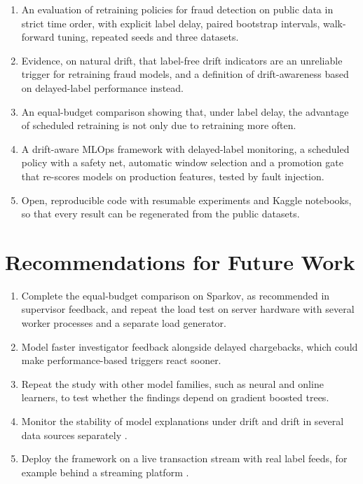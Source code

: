 \begin{enumerate}
  \item An evaluation of retraining policies for fraud detection on public data in strict time order, with explicit label delay, paired bootstrap intervals, walk-forward tuning, repeated seeds and three datasets.
  \item Evidence, on natural drift, that label-free drift indicators are an unreliable trigger for retraining fraud models, and a definition of drift-awareness based on delayed-label performance instead.
  \item An equal-budget comparison showing that, under label delay, the advantage of scheduled retraining is not only due to retraining more often.
  \item A drift-aware MLOps framework with delayed-label monitoring, a scheduled policy with a safety net, automatic window selection and a promotion gate that re-scores models on production features, tested by fault injection.
  \item Open, reproducible code with resumable experiments and Kaggle notebooks, so that every result can be regenerated from the public datasets.
\end{enumerate}

\section{Recommendations for Future Work}\label{sec:future}

\begin{enumerate}
  \item Complete the equal-budget comparison on Sparkov, as recommended in supervisor feedback, and repeat the load test on server hardware with several worker processes and a separate load generator.
  \item Model faster investigator feedback alongside delayed chargebacks, which could make performance-based triggers react sooner.
  \item Repeat the study with other model families, such as neural and online learners, to test whether the findings depend on gradient boosted trees.
  \item Monitor the stability of model explanations under drift \cite{john2025,uddin2026} and drift in several data sources separately \cite{hassan2026}.
  \item Deploy the framework on a live transaction stream with real label feeds, for example behind a streaming platform \cite{kaushik2025}.
\end{enumerate}
